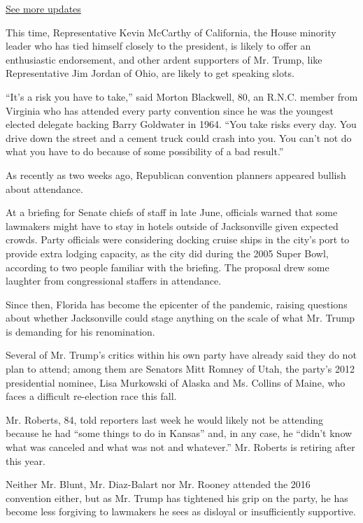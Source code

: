\href{https://www.nytimes3xbfgragh.onion/2020/08/04/us/elections/primary-election-michigan-arizona-kansas.html?action=click\&pgtype=Article\&state=default\&region=MAIN_CONTENT_1\&context=storylines_live_updates}{See
more updates}

This time, Representative Kevin McCarthy of California, the House
minority leader who has tied himself closely to the president, is likely
to offer an enthusiastic endorsement, and other ardent supporters of Mr.
Trump, like Representative Jim Jordan of Ohio, are likely to get
speaking slots.

``It's a risk you have to take,'' said Morton Blackwell, 80, an R.N.C.
member from Virginia who has attended every party convention since he
was the youngest elected delegate backing Barry Goldwater in 1964. ``You
take risks every day. You drive down the street and a cement truck could
crash into you. You can't not do what you have to do because of some
possibility of a bad result.''

As recently as two weeks ago, Republican convention planners appeared
bullish about attendance.

At a briefing for Senate chiefs of staff in late June, officials warned
that some lawmakers might have to stay in hotels outside of Jacksonville
given expected crowds. Party officials were considering docking cruise
ships in the city's port to provide extra lodging capacity, as the city
did during the 2005 Super Bowl, according to two people familiar with
the briefing. The proposal drew some laughter from congressional
staffers in attendance.

Since then, Florida has become the epicenter of the pandemic, raising
questions about whether Jacksonville could stage anything on the scale
of what Mr. Trump is demanding for his renomination.

Several of Mr. Trump's critics within his own party have already said
they do not plan to attend; among them are Senators Mitt Romney of Utah,
the party's 2012 presidential nominee, Lisa Murkowski of Alaska and Ms.
Collins of Maine, who faces a difficult re-election race this fall.

Mr. Roberts, 84, told reporters last week he would likely not be
attending because he had ``some things to do in Kansas'' and, in any
case, he ``didn't know what was canceled and what was not and
whatever.'' Mr. Roberts is retiring after this year.

Neither Mr. Blunt, Mr. Diaz-Balart nor Mr. Rooney attended the 2016
convention either, but as Mr. Trump has tightened his grip on the party,
he has become less forgiving to lawmakers he sees as disloyal or
insufficiently supportive.


